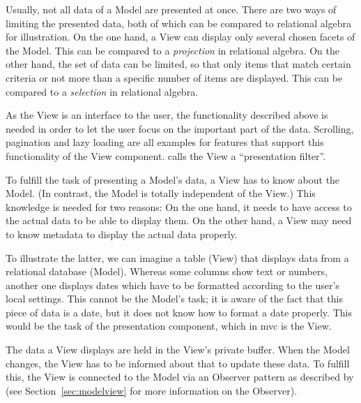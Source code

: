 Usually, not all data of a Model are presented at once. There are two ways of limiting the presented data, both of which can be compared to relational algebra for illustration. On the one hand, a View can display only several chosen facets of the Model. This can be compared to a \emph{projection} in relational algebra. On the other hand, the set of data can be limited, so that only items that match certain criteria or not more than a specific number of items are displayed. This can be compared to a \emph{selection} in relational algebra.

As the View is an interface to the user, the functionality described above is needed in order to let the user focus on the important part of the data. Scrolling, pagination and lazy loading are all examples for features that support this functionality of the View component.  calls the View a ``presentation filter''.

To fulfill the task of presenting a Model's data, a View has to know about the Model. (In contrast, the Model is totally independent of the View.) This knowledge is needed for two reasons: On the one hand, it needs to have access to the actual data to be able to display them. On the other hand, a View may need to know metadata to display the actual data properly.

To illustrate the latter, we can imagine a table (View) that displays data from a relational database (Model). Whereas some columns show text or numbers, another one displays dates which have to be formatted according to the user's local settings. This cannot be the Model's task; it is aware of the fact that this piece of data is a date, but it does not know how to format a date properly. This would be the task of the presentation component, which in \acl{mvc} is the View.

The data a View displays are held in the View's private buffer. When the Model changes, the View has to be informed about that to update these data. To fulfill this, the View is connected to the Model via an Observer pattern as described by  (see Section~\ref{sec:modelview} for more information on the Observer).

